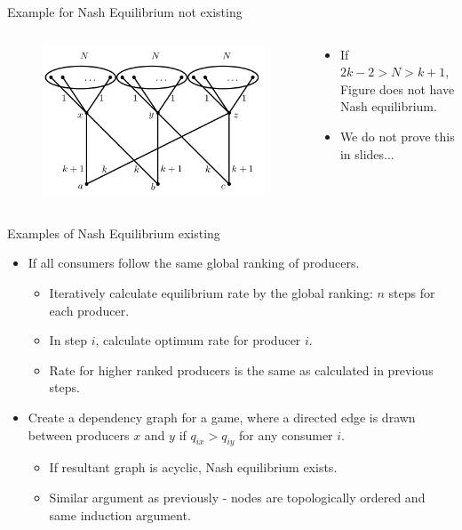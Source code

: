 \documentclass[aspectratio=169]{beamer}
\newcommand{\bi}{\begin{itemize}}
\newcommand{\ei}{\end{itemize}}
\begin{document}
\begin{frame}{Example for Nash Equilibrium not existing}
    \begin{columns}[T]
        \begin{column}{0.2\textwidth}
            \begin{figure}
                \includegraphics[scale=0.2]{./figures/follow_nash.png}
            \end{figure}
        \end{column}
        \begin{column}{0.2\textwidth}
            \pause
            \bi
        \item If $2k -2 > N > k + 1$, Figure does not have Nash equilibrium.
            \pause
        \item We do not prove this in slides...
            \ei
        \end{column}
    \end{columns}
\end{frame}

\begin{frame}{Examples of Nash Equilibrium existing}
    \bi
\item If all consumers follow the same global ranking of producers.
    \pause
    \bi
    \pause
\item Iteratively calculate equilibrium rate by the global ranking: $n$ steps for each producer.
    \pause
\item In step $i$, calculate optimum rate for producer $i$.
    \pause
\item Rate for higher ranked producers is the same as calculated in previous
    steps.
    \ei
    \pause
\item Create a dependency graph for a game, where a directed edge is drawn between
    producers $x$ and $y$ if $q_{ix} > q_{iy}$ for any consumer $i$.
    \bi
\item If resultant graph is acyclic, Nash equilibrium exists.
    \pause
\item Similar argument as previously - nodes are topologically ordered and same
    induction argument.
    \ei
    \ei
\end{frame}
\end{document}
